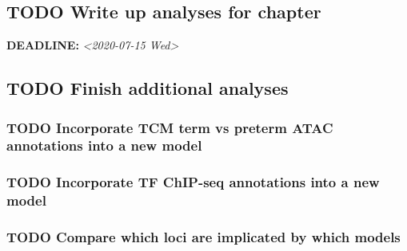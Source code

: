 \documentclass[11pt]{article}
\begin{document}
\subsection*{{\bfseries\sffamily TODO}  Write up analyses for chapter}
\label{sec:org26358b3}
\noindent\textbf{DEADLINE:} \textit{<2020-07-15 Wed>   }\\
\subsection*{{\bfseries\sffamily TODO}  Finish additional analyses}
\label{sec:org1a3d459}
\subsubsection*{{\bfseries\sffamily TODO}  Incorporate TCM term vs preterm ATAC annotations into a new model}
\label{sec:orgc7ebf33}
\subsubsection*{{\bfseries\sffamily TODO}  Incorporate TF ChIP-seq annotations into a new model}
\label{sec:org9974a4f}
\subsubsection*{{\bfseries\sffamily TODO}  Compare which loci are implicated by which models}
\label{sec:orgbd02185}



\end{document}
